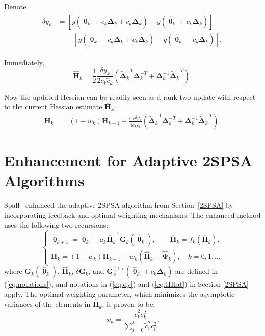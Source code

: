 \documentclass[conference]{IEEEtran}
\newcommand{\bG}{\bm{G}}
\newcommand{\bDelta}{\bm{\Delta}}
\newcommand{\oH}{\bm{\overline{H}}}
\newcommand{\ooH}{\bm{\overline{\overline{H}}}}
\newcommand{\hH}{\bm{\hat{H}}}
\newcommand{\hPsi}{\bm{\hat{\Psi}}}
\newcommand{\htheta}{\bm{\hat{\uptheta}}}
\newcommand{\tDelta}{\bm{\tilde{\Delta}}}
\begin{document}
Denote
\begin{align} \label{eq:dy}
  \begin{split} \delta
    y_k&=[y(\htheta_k+c_k\bDelta_k+\tilde{c}_k\tDelta_k)-y(\htheta_k+c_k\bDelta_k)]\\
    &\quad-[y(\htheta_k-c_k\bDelta_k+\tilde{c}_k\tDelta_k)-y(\htheta_k-c_k\bDelta_k)],
  \end{split}
\end{align}

Immediately,
\begin{equation} \label{eq:HHat} \hH_k=\frac{1}{2}\frac{\delta
    y_k}{2c_k\tilde{c}_k}\left(
    \tDelta_k^{-1}\bDelta_k^{-T}+\bDelta_k^{-1}\tDelta_k^{-T} \right).
\end{equation}

Now the updated Hessian can be readily seen as a rank two
update with respect to the current Hessian estimate $\oH_k$:
\begin{align*}
\oH_k &= (1 - w_k)\oH_{k-1} + \frac{w_k \delta y_k}{4c_k\tilde{c}_k} (\tDelta_k^{-1}\bDelta_k^{-T}+\bDelta_k^{-1}\tDelta_k^{-T}).
\end{align*}


\section{Enhancement for Adaptive 2SPSA Algorithms}
\label{Enhanced 2SPSA}
Spall~\cite{Spall2009} enhanced the adaptive 2SPSA
algorithm from Section~\ref{2SPSA} by incorporating feedback and
optimal weighting mechanisms. The enhanced method
uses the following two recursions:
\begin{equation} \label{eq:Enhancement}
  \begin{cases} \htheta_{k+1}=\htheta_k-a_k\ooH_k^{-1} \bG_k(\htheta_k),
    \qquad \bm{\ooH}_k=f_k(\oH_k),\\
    \oH_k=(1-w_k)\oH_{k-1}+w_k(\hH_k-\hPsi_k),
    \quad k=0,1,\dots
  \end{cases}
\end{equation}
where $\bG_k(\htheta_k)$, $\hH_k$,
$\delta\bG_k$, and $\bG_k^{(1)}(\htheta_k\pm c_k\bDelta_k)$ are
defined in (\ref{eq:notations}), and notations in (\ref{eq:dy}) and
(\ref{eq:HHat}) in Section \ref{2SPSA} apply. The optimal weighting
parameter, which minimizes the asymptotic variances of the elements in
$\hH_k$, is proven to be:
\begin{equation} \label{eq:weighting}
  w_k=\frac{\tilde{c}_k^2c_k^2}{\sum_{i=0}^{k}\tilde{c}_i^2c_i^2}.
\end{equation}
\end{document}
